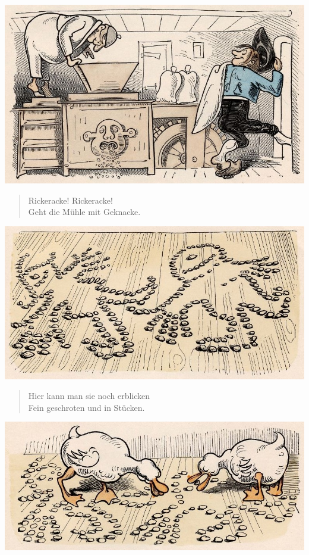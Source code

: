 \documentclass[a4paper,12pt]{article}
\begin{document}
\begin{center}\includegraphics[scale=.7, alt={... und herau}]{images/7-10.jpg}\end{center}



\begin{verse}
Rickeracke! Rickeracke!\\{}
Geht die Mühle mit Geknacke.
\end{verse}



\begin{center}\includegraphics[scale=.7, alt={Fein geschroten}]{images/7-11.jpg}\end{center}



\begin{verse}
Hier kann man sie noch erblicken\\{}
Fein geschroten und in Stücken.
\end{verse}



\begin{center}\includegraphics[scale=.7, alt={... und verzehrt}]{images/7-12.jpg}\end{center}
\end{document}
